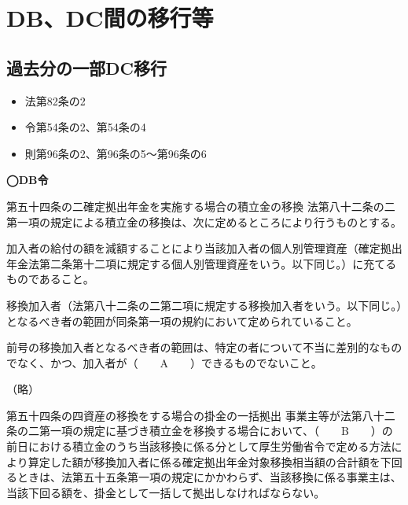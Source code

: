 \section{DB、DC間の移行等}

\subsection{過去分の一部DC移行}

\begin{InyouJobunbox}
  \begin{itemize}
    \item 法第82条の2
    \item 令第54条の2、第54条の4
    \item 則第96条の2、第96条の5〜第96条の6
  \end{itemize}
\end{InyouJobunbox}

\begin{fillblank}[年金2 2018 問題1(3)B,C]
  \noindent \textbf{◯DB令}
  \begin{lawstructure}
    \begin{lawarticle}{第五十四条の二}{確定拠出年金を実施する場合の積立金の移換}
      法第八十二条の二第一項の規定による積立金の移換は、次に定めるところにより行うものとする。

      加入者の給付の額を減額することにより当該加入者の個人別管理資産（確定拠出年金法第二条第十二項に規定する個人別管理資産をいう。以下同じ。）に充てるものであること。

      移換加入者（法第八十二条の二第二項に規定する移換加入者をいう。以下同じ。）となるべき者の範囲が同条第一項の規約において定められていること。

      前号の移換加入者となるべき者の範囲は、特定の者について不当に差別的なものでなく、かつ、加入者が（　　A　　）できるものでないこと。
      
      （略）    
    \end{lawarticle}

    \begin{lawarticle}{第五十四条の四}{資産の移換をする場合の掛金の一括拠出}
      事業主等が法第八十二条の二第一項の規定に基づき積立金を移換する場合において、（　　B　　）の前日における積立金のうち当該移換に係る分として厚生労働省令で定める方法により算定した額が移換加入者に係る確定拠出年金対象移換相当額の合計額を下回るときは、法第五十五条第一項の規定にかかわらず、当該移換に係る事業主は、当該下回る額を、掛金として一括して拠出しなければならない。
    \end{lawarticle}
  \end{lawstructure}
\end{fillblank}


